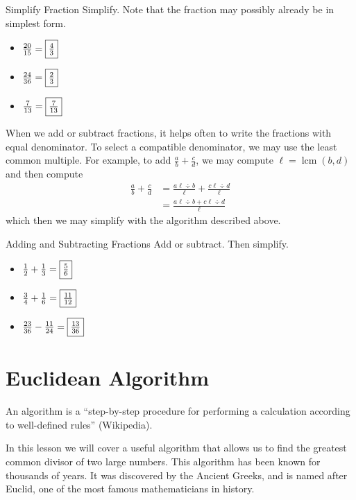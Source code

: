 \documentclass[a4paper,10pt]{report}
\begin{document}
\begin{problem}{Simplify Fraction}
 Simplify. Note that the fraction may possibly already be in simplest form.

 \begin{itemize}
  \item \(\frac{20}{15}=\Ans{\frac{4}{3}}\)
  \item \(\frac{24}{36}=\Ans{\frac{2}{3}}\)
  \item \(\frac{7}{13}=\Ans{\frac{7}{13}}\)
 \end{itemize}
\end{problem}

When we add or subtract fractions, it helps often to write the fractions with
equal denominator. To select a compatible denominator, we may use the least
common multiple. For example, to add \(\frac{a}{b}+\frac{c}{d}\), we may
compute \(\ell=\operatorname{lcm}(b, d)\) and then compute \begin{align*}
 \frac{a}{b}+\frac{c}{d}
 &= \frac{a\ell\div b}{\ell} + \frac{c\ell\div d}{\ell} \\
 &= \frac{a\ell\div b + c\ell\div d}{\ell}
\end{align*} which then we may simplify with the algorithm described above.

\begin{problem}{Adding and Subtracting Fractions}
 Add or subtract. Then simplify.

 \begin{itemize}
  \item \(\frac{1}{2} + \frac{1}{3} = \Ans{\frac{5}{6}}\)
  \item \(\frac{3}{4} + \frac{1}{6} = \Ans{\frac{11}{12}}\)
  \item \(\frac{23}{36} - \frac{11}{24} = \Ans{\frac{13}{36}}\)
 \end{itemize}
\end{problem}

\section{Euclidean Algorithm}

An \gls{algorithm} is a ``step-by-step procedure for performing a calculation
according to well-defined rules'' (Wikipedia).

In this lesson we will cover a useful algorithm that allows us to find the
greatest common divisor of two large numbers. This algorithm has been known for
thousands of years. It was discovered by the Ancient Greeks, and is named after
Euclid, one of the most famous mathematicians in history.
\end{document}
